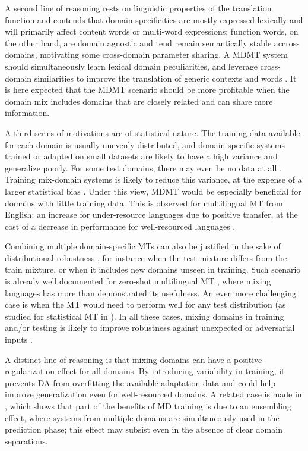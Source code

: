 \documentclass[11pt,a4paper]{article}
\begin{document}
A second line of reasoning rests on linguistic properties of the translation function and contends that domain specificities are mostly expressed lexically and will primarily affect content words or multi-word expressions; function words, on the other hand, are domain agnostic and tend remain semantically stable accross domains, motivating some cross-domain parameter sharing. A MDMT system should simultaneously learn lexical domain peculiarities, and leverage cross-domain similarities to improve the translation of generic contexts and words \cite{Zeng18multidomain,Pham19generic}. It is here expected that the MDMT scenario should be more profitable when the domain mix includes domains that are closely related and can share more information.

A third series of motivations are of statistical nature. The training data available for each domain is usually unevenly distributed, and domain-specific systems trained or adapted on small datasets are likely to have a high variance and generalize poorly. For some test domains, there may even be no data at all \cite{Farajian17neural}. Training mix-domain systems is likely to reduce this variance, at the expense of a larger statistical bias \cite{Clark12onesystem}. Under this view, MDMT would be especially beneficial for domains with little training data. This is observed for multilingual MT from English: an increase for under-resource languages due to positive transfer, at the cost of a decrease in performance for well-resourced languages \cite{Arivazhagan19massively}.

Combining multiple domain-specific MTs can also be justified in the sake of distributional robustness \cite{Mansour09domainadaptation,Mansour09multiple}, for instance when the test mixture differs from the train mixture, or when it includes new domains unseen in training. Such scenario is already well documented for zero-shot multilingual MT \cite{Firat16multiway,Ha16towards,Johnson17google,Platanios18contextual}, where mixing languages has more than demonstrated its usefulness.  An even more challenging case is when the MT would need to perform well for any test distribution (as studied for statistical MT in \cite{Huck15mixeddomain}). In all these cases, mixing domains in training and/or testing is likely to improve robustness against unexpected or adversarial inputs \cite{Oren19distributionally}.

A distinct line of reasoning is that mixing domains can have a positive regularization effect for all domains. By introducing variability in training, it prevents DA from overfitting the available adaptation data and could help improve generalization even for well-resourced domains. A related case is made in \cite{Joshi12multidomain}, which shows that part of the benefits of MD training is due to an ensembling effect, where systems from multiple domains are simultaneously used in the prediction phase; this effect may subsist even in the absence of clear domain separations.
\end{document}
